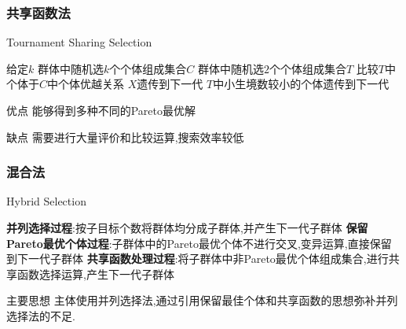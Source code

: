 \documentclass{beamer}
\begin{document}
	\begin{frame}
		\frametitle{共享函数法}
\begin{algorithm}[H]                           %
\caption{Tournament Sharing Selection}          %
\label{alg1}      %
\begin{algorithmic}[1]  %
	\STATE 给定$k$
	\STATE 群体中随机选$k$个个体组成集合$C$
	\STATE 群体中随机选$2$个个体组成集合$T$
	\STATE 比较$T$中个体于$C$中个体优越关系
		\STATE $X$遗传到下一代
	\ELSE
		\STATE $T$中小生境数较小的个体遗传到下一代
	\ENDIF
	
\end{algorithmic}
\end{algorithm}
\end{frame}
\begin{frame}
\begin{block}{优点}
	能够得到多种不同的Pareto最优解
\end{block}
\begin{block}{缺点}
	需要进行大量评价和比较运算,搜索效率较低
\end{block}
\end{frame}
\begin{frame}
	\frametitle{混合法}
	\begin{algorithm}[H]                           %
		\caption{Hybrid Selection}          %
		\label{alg2}      %
		\begin{algorithmic}[1]  %
			\STATE \textbf{并列选择过程}:按子目标个数将群体均分成子群体,并产生下一代子群体
			\STATE \textbf{保留Pareto最优个体过程}:子群体中的Pareto最优个体不进行交叉,变异运算,直接保留到下一代子群体
			\STATE \textbf{共享函数处理过程}:将子群体中非Pareto最优个体组成集合,进行共享函数选择运算,产生下一代子群体
		\end{algorithmic}
	\end{algorithm}
		\begin{block}{主要思想}
			主体使用并列选择法,通过引用保留最佳个体和共享函数的思想弥补并列选择法的不足.
		\end{block}
	

\end{frame}
\end{document}
